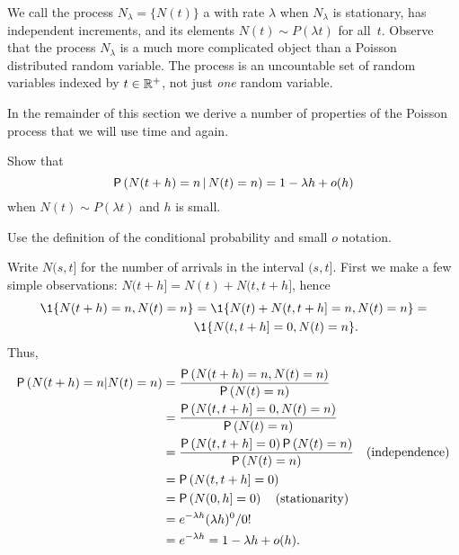 We call the process $N_\lambda=\{N(t)\}$ a  with rate $\lambda$ when $N_\lambda$ is stationary, has independent increments, and its elements $N(t)\sim P(\lambda t)$ for all~$t$.
Observe that the process $N_\lambda$ is a much more complicated object than a Poisson distributed random variable.
The process is an uncountable set of random variables indexed by $t\in \mathbb{R}^+$, not just \emph{one} random variable.


In the remainder of this section we derive a number of properties of the Poisson process that we will use time and again.


\begin{exercise} 
 Show that 
 \begin{equation*}
\P{N(t+h) = n \given N(t) = n} = 1-\lambda h + o(h)
 \end{equation*}
when $N(t) \sim P(\lambda t)$ and $h$ is small. 
\begin{hint}
Use the definition of the conditional probability and small $o$ notation.

\end{hint}
\begin{solution}
Write $N(s, t]$ for the number of arrivals in the interval $(s,t]$. First we make a few simple observations: $N(t+h]= N(t) + N(t, t+h]$, hence
\begin{equation*}
 \begin{split}
 \1{N(t+h)=n, N(t)=n}
&= \1{N(t) + N(t, t+h] = n, N(t)=n} = \\
&\1{N(t, t+h] = 0, N(t)=n}.
 \end{split}
\end{equation*}
Thus, 
 \begin{align*}
 \P{N(t+h) = n | N(t) = n} 
&= \frac{\P{N(t+h) = n, N(t) = n}}{\P{N(t)=n}} \\
&= \frac{\P{N(t, t+h] = 0, N(t) = n}}{\P{N(t)=n}} \\
&= \frac{\P{N(t, t+h] = 0} \P{N(t) = n}}{\P{N(t)=n}} \quad \text{(independence)}\\
&= \P{N(t, t+h] = 0} \\
&= \P{N(0, h] = 0} \quad\text{(stationarity)} \\
&= e^{-\lambda h} (\lambda h)^0/0! \\
&= e^{-\lambda h} = 1-\lambda h + o(h).
 \end{align*}
\end{solution}
\end{exercise}

